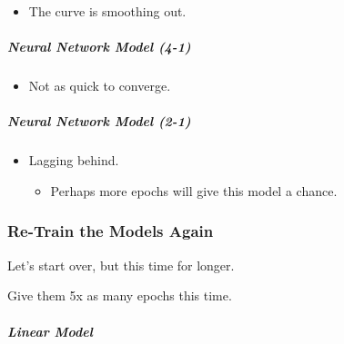 \documentclass[11pt]{article}
\providecommand{\tightlist}{%
      \setlength{\itemsep}{0pt}\setlength{\parskip}{0pt}}
\begin{document}
\begin{itemize}
\tightlist
\item
  The curve is smoothing out.
\end{itemize}

\subparagraph{Neural Network Model
(4-1)}\label{neural-network-model-4-1}

\begin{itemize}
\tightlist
\item
  Not as quick to converge.
\end{itemize}

\subparagraph{Neural Network Model
(2-1)}\label{neural-network-model-2-1}

\begin{itemize}
\tightlist
\item
  Lagging behind.

  \begin{itemize}
  \tightlist
  \item
    Perhaps more epochs will give this model a chance.
  \end{itemize}
\end{itemize}

    \subsubsection{Re-Train the Models
Again}\label{re-train-the-models-again}

Let's start over, but this time for longer.

Give them 5x as many epochs this time.

    \subparagraph{Linear Model}\label{linear-model}
\end{document}
